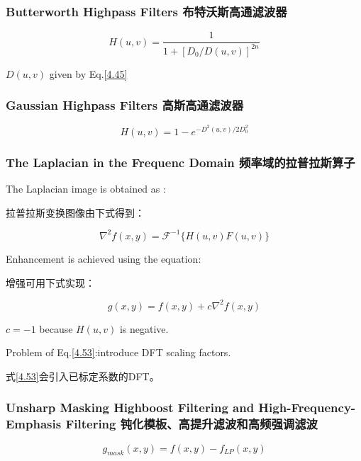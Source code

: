 \documentclass[12pt]{article}
\numberwithin{equation}{section}%
\begin{document}
\subsubsection{Butterworth Highpass Filters 布特沃斯高通滤波器}

\begin{equation} \label{4.51}
H(u,v)=\frac{1}{1+[D_{0}/D(u,v)]^{2n}}
\end{equation}

$D(u,v)$ given by Eq.\ref{4.45}

\subsubsection{Gaussian Highpass Filters 高斯高通滤波器}

\begin{equation} \label{4.52}
H(u,v)=1-e^{-D^{2}(u,v)/2D_{0}^{2}}
\end{equation} 

\subsubsection{The Laplacian in the Frequenc Domain 频率域的拉普拉斯算子}

The Laplacian image is obtained as :

拉普拉斯变换图像由下式得到：

\begin{equation} \label{4.53}
\nabla^{2}f(x,y)=\mathscr{F}^{-1}\{H(u,v)F(u,v)\}
\end{equation} 

Enhancement is achieved using the equation:

增强可用下式实现：

\begin{equation} \label{4.54}
g(x,y)=f(x,y)+c\nabla^{2}f(x,y)
\end{equation} 

$c=-1$ because $H(u,v)$ is negative.

Problem of Eq.\ref{4.53}:introduce DFT scaling factors.

式\ref{4.53}会引入已标定系数的DFT。

\subsubsection{Unsharp Masking Highboost Filtering and High-Frequency-Emphasis Filtering 钝化模板、高提升滤波和高频强调滤波}

\begin{equation} \label{4.55}
g_{mask}(x,y)=f(x,y)-f_{LP}(x,y)
\end{equation} 
\end{document}
